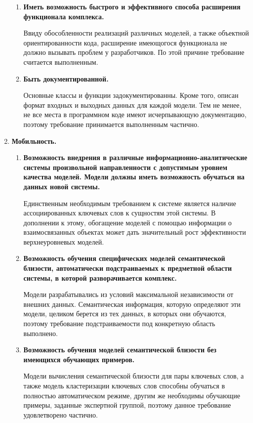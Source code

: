 \begin{enumerate}
\begin{enumerate}[label*=\arabic*.]
        \item  \textbf{Иметь возможность быстрого и эффективного способа расширения функционала комплекса.}
            
            Ввиду обособленности реализаций различных моделей, а также объектной ориентированности кода, расширение имеющогося функционала не должно вызывать проблем у разработчиков. По этой причине требование считается выполненным.

        \item  \textbf{Быть документированной.}

            Основные классы и функции задокументированны. Кроме того, описан формат входных и выходных данных для каждой модели. Тем не менее, не все места в программном коде имеют исчерпывающую документацию, поэтому требование принимается выполненным частично.

    \end{enumerate}
    \item \textbf{Мобильность.}
    \begin{enumerate}[label*=\arabic*.]
        \item \textbf{Возможность внедрения в различные информационно-аналитические системы произвольной направленности с допустимым уровнем качества моделей. Модели должны иметь возможность обучаться на данных новой системы.}

            Единственным необходимым требованием к системе является наличие ассоциированных ключевых слов к сущностям этой системы. В дополнении к этому, обогащение моделей с помощью информации о взаимосвязанных объектах может дать значительный рост эффективности верхнеуровневых моделей.
        
        \item \textbf{Возможность обучения специфических моделей семантической близости, автоматически подстраиваемых к предметной области системы, в которой разворачивается комплекс.}

            Модели разрабатывались из условий максимальной независимости от внешних данных. Семантическая информация, которую определяют эти модели, целиком берется из тех данных, в которых они обучаются, поэтому требование подстраиваемости под конкретную область выполнено.

        \item \textbf{Возможность обучения моделей семантической близости без имеющихся обучающих примеров.}

            Модели вычисления семантической близости для пары ключевых слов, а также модель кластеризации ключевых слов способны обучаться в полностью автоматическом режиме, другим же необходимы обучающие примеры, заданные экспертной группой, поэтому данное требование удовлетворено частично.


\end{enumerate}
\end{enumerate}
